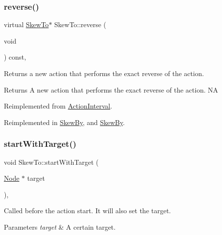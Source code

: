 \subsubsection{\texorpdfstring{reverse()}{reverse()}\hspace{0.1cm}{\footnotesize\ttfamily [2/2]}}
{\footnotesize\ttfamily virtual \hyperlink{classSkewTo}{Skew\+To}$\ast$ Skew\+To\+::reverse (\begin{DoxyParamCaption}\item[{void}]{ }\end{DoxyParamCaption}) const\hspace{0.3cm}{\ttfamily [override]}, {\ttfamily [virtual]}}

Returns a new action that performs the exact reverse of the action.

\begin{DoxyReturn}{Returns}
A new action that performs the exact reverse of the action.  NA 
\end{DoxyReturn}


Reimplemented from \hyperlink{classActionInterval_a9f9ac7164036a0bc261a72f62a2b2da7}{Action\+Interval}.



Reimplemented in \hyperlink{classSkewBy_aab134941d72a83d6249553e8e772da35}{Skew\+By}, and \hyperlink{classSkewBy_ab7828c1588809a605fac2cba100f148d}{Skew\+By}.

\mbox{\label{classSkewTo_a43613e8ef08aead6e3dab8d27dda7c0e}} 
\subsubsection{\texorpdfstring{start\+With\+Target()}{startWithTarget()}\hspace{0.1cm}{\footnotesize\ttfamily [1/2]}}
{\footnotesize\ttfamily void Skew\+To\+::start\+With\+Target (\begin{DoxyParamCaption}\item[{\hyperlink{classNode}{Node} $\ast$}]{target }\end{DoxyParamCaption})\hspace{0.3cm}{\ttfamily [override]}, {\ttfamily [virtual]}}

Called before the action start. It will also set the target.


\begin{DoxyParams}{Parameters}
{\em target} & A certain target. \\
\hline
\end{DoxyParams}


